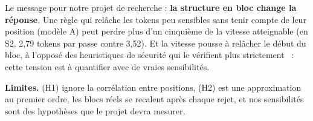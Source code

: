 \documentclass[11pt,a4paper]{article}
\theoremstyle{plain}
\theoremstyle{definition}
\begin{document}
Le message pour notre projet de recherche : \textbf{la structure en bloc change la réponse}. Une règle qui relâche les tokens peu sensibles sans tenir compte de leur position (modèle A) peut perdre plus d'un cinquième de la vitesse atteignable (en S2, 2,79 tokens par passe contre 3,52). Et la vitesse pousse à relâcher le début du bloc, à l'opposé des heuristiques de sécurité qui le vérifient plus strictement~\cite{secure} : cette tension est à quantifier avec de vraies sensibilités.

\textbf{Limites.} (H1) ignore la corrélation entre positions, (H2) est une approximation au premier ordre, les blocs réels se recalent après chaque rejet, et nos sensibilités sont des hypothèses que le projet devra mesurer.

\appendix
\end{document}
